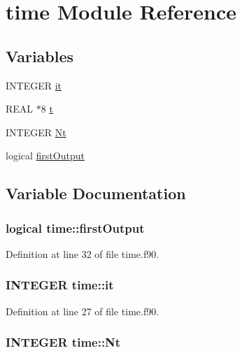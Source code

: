 \hypertarget{namespacetime}{
\section{time Module Reference}
\label{namespacetime}
}
\subsection*{Variables}
\begin{DoxyCompactItemize}
\item 
INTEGER \hyperlink{namespacetime_a1c2033688a38409cbcaad410e84a8112}{it}
\item 
REAL $\ast$8 \hyperlink{namespacetime_aa46f2c3f534f88596e49840033d82a8a}{t}
\item 
INTEGER \hyperlink{namespacetime_a4c36d14fae709416558ca0d915019452}{Nt}
\item 
logical \hyperlink{namespacetime_a85d38f2317f7267d268d28eabe5c1e06}{firstOutput}
\end{DoxyCompactItemize}


\subsection{Variable Documentation}
\hypertarget{namespacetime_a85d38f2317f7267d268d28eabe5c1e06}{
\subsubsection[{firstOutput}]{\setlength{\rightskip}{0pt plus 5cm}logical {\bf time::firstOutput}}}
\label{namespacetime_a85d38f2317f7267d268d28eabe5c1e06}


Definition at line 32 of file time.f90.

\hypertarget{namespacetime_a1c2033688a38409cbcaad410e84a8112}{
\subsubsection[{it}]{\setlength{\rightskip}{0pt plus 5cm}INTEGER {\bf time::it}}}
\label{namespacetime_a1c2033688a38409cbcaad410e84a8112}


Definition at line 27 of file time.f90.

\hypertarget{namespacetime_a4c36d14fae709416558ca0d915019452}{
\subsubsection[{Nt}]{\setlength{\rightskip}{0pt plus 5cm}INTEGER {\bf time::Nt}}}
\label{namespacetime_a4c36d14fae709416558ca0d915019452}


